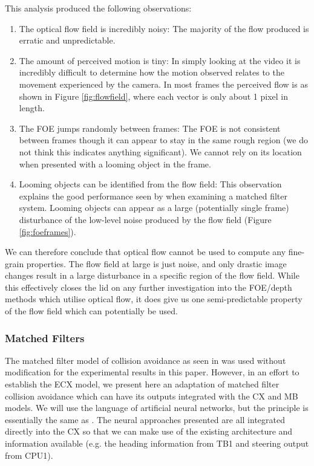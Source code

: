 \documentclass[a4paper,11pt,twoside,openright]{article}
\begin{document}
This analysis produced the following observations:
\begin{enumerate}
\item{
  The optical flow field is incredibly noisy: The majority of the flow produced
  is erratic and unpredictable.
}

\item{
  The amount of perceived motion is tiny: In simply looking at the video it is
  incredibly difficult to determine how the motion observed relates to the
  movement experienced by the camera. In most frames the perceived
  flow is as shown in Figure \ref{fig:flowfield}, where each vector is
  only about 1 pixel in length.
}

\item{ The FOE jumps randomly between frames: The FOE is not
  consistent between frames though it can appear to stay in the same
  rough region (we do not think this indicates anything
  significant). We cannot rely on its location when presented with a
  looming object in the frame.  }

\item{ Looming objects can be identified from the flow field: This
  observation explains the good performance seen by
  \cite{Mitchell2018} when examining a matched filter system. Looming
  objects can appear as a large (potentially single frame) disturbance
  of the low-level noise produced by the flow field (Figure
  \ref{fig:foeframes}).  }
\end{enumerate}

We can therefore conclude that optical flow cannot be used to compute
any fine-grain properties. The flow field at large is just noise, and
only drastic image changes result in a large disturbance in a specific
region of the flow field. While this effectively closes the lid on any
further investigation into the FOE/depth methods which utilise optical
flow, it does give us one semi-predictable property of the flow field
which can potentially be used.

\subsubsection{Matched Filters}
The matched filter model of collision avoidance as seen in
\cite{Mitchell2018} was used without modification for the experimental
results in this paper.  However, in an effort to establish the ECX
model, we present here an adaptation of matched filter collision
avoidance which can have its outputs integrated with the CX and MB
models. We will use the language of artificial neural networks, but
the principle is essentially the same as \cite{Mitchell2018}. The
neural approaches presented are all integrated directly into the CX so
that we can make use of the existing architecture and information
available (e.g. the heading information from TB1 and steering output
from CPU1).
\newline\par
\end{document}
